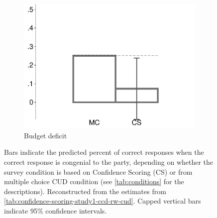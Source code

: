 \begin{figure}[t]
\begin{subfigure}{.325\textwidth}
		\includegraphics[width=\textwidth]{../figs/confidence_score_ccd_cud_rw_deficit_study1.pdf}
		\caption{Budget deficit}
	\end{subfigure}	
	\caption*{\footnotesize 
		Bars indicate the predicted percent of correct responses when the correct response is congenial to the party, depending on whether the survey condition is based on Confidence Scoring (CS) or from multiple choice CUD condition (see \cref{tab:conditions} for the descriptions).
		Reconstructed from the estimates from \cref{tab:confidence-scoring-study1-ccd-rw-cud}.
		Capped vertical bars indicate 95\% confidence intervals.
	}
	\label{fig:confidence-scoring-study1-ccd-rw-cud}
\end{figure}

